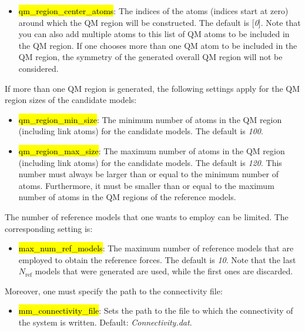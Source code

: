\documentclass[]{tufte-book}
\begin{document}
{{\begin{itemize}
\item \hl{qm\_region\_center\_atoms}: The indices of the atoms (indices start at zero) around which the QM region will be constructed. The default is [\textit{0}]. Note that you can also add multiple atoms to this list of QM atoms to be included in the QM region. If one chooses more than one QM atom to be included in the QM region, the symmetry of the generated overall QM region will not be considered.
\end{itemize}

If more than one QM region is generated, the following settings apply for the QM region sizes of the candidate models:

\begin{itemize}
\item \hl{qm\_region\_min\_size}: The minimum number of atoms in the QM region (including link atoms) for the candidate models. The default is \textit{100}.
\item \hl{qm\_region\_max\_size}: The maximum number of atoms in the QM region (including link atoms) for the candidate models. The default is \textit{120}. This number must always be larger than or equal to the minimum number of atoms. Furthermore, it must be smaller than or equal to the maximum number of atoms in the QM regions of the reference models.
\end{itemize}

The number of reference models that one wants to employ can be limited. The corresponding setting is:

\begin{itemize}
\item \hl{max\_num\_ref\_models}: The maximum number of reference models that are employed to obtain the reference forces. The default is \textit{10}. Note that the last $N_\text{ref}$ models that were generated are used, while the first ones are discarded.
\end{itemize}

Moreover, one must specify the path to the connectivity file:

\begin{itemize}
\item \hl{mm\_connectivity\_file}: Sets the path to the file to which the connectivity of the system is written. Default: \textit{Connectivity.dat}.
\end{itemize}

}}
\end{document}
